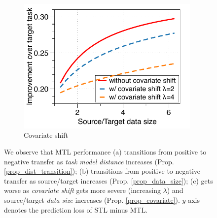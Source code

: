 \begin{figure}[!t]
\begin{subfigure}[b]{0.32\textwidth}
		\centering
		\includegraphics[width=0.98\textwidth]{figures/complementary.pdf}
		\vspace{-0.075in}
		\caption{Covariate shift}
		\label{fig_covariate}
	\end{subfigure}
	\caption{%
	We observe that MTL performance
	(a) transitions from positive to negative transfer as \textit{task model distance} increases (Prop. \ref{prop_dist_transition});
	(b) transitions from positive to negative transfer as source/target  increases (Prop. \ref{prop_data_size});
	(c) gets worse as \textit{covariate shift} gets more severe (increasing $\lambda$) and source/target \textit{data size} increases (Prop. \ref{prop_covariate}).
	$y$-axis denotes the prediction loss of STL minus MTL.}
	\label{fig_model_shift_phasetrans}
	\vspace{-0.1in}
\end{figure}




